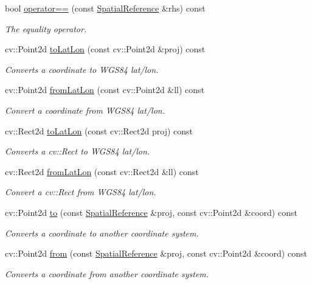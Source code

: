 \begin{DoxyCompactItemize}
bool \hyperlink{group___imagery_module_ga2c033f8a8c0c70c1db52343f66cc3245}{operator==} (const \hyperlink{classdg_1_1deepcore_1_1imagery_1_1_spatial_reference}{Spatial\+Reference} \&rhs) const 
\begin{DoxyCompactList}\small\item\em The equality operator. \end{DoxyCompactList}\item 
cv\+::\+Point2d \hyperlink{group___imagery_module_gad8d72dd386f86fd70fcd71197e408dfd}{to\+Lat\+Lon} (const cv\+::\+Point2d \&proj) const 
\begin{DoxyCompactList}\small\item\em Converts a coordinate to W\+G\+S84 lat/lon. \end{DoxyCompactList}\item 
cv\+::\+Point2d \hyperlink{group___imagery_module_gab9474c2105f1354b4139d5a905699f36}{from\+Lat\+Lon} (const cv\+::\+Point2d \&ll) const 
\begin{DoxyCompactList}\small\item\em Convert a coordinate from W\+G\+S84 lat/lon. \end{DoxyCompactList}\item 
cv\+::\+Rect2d \hyperlink{group___imagery_module_ga9d0268dbc9fbd5210fb0487915340737}{to\+Lat\+Lon} (const cv\+::\+Rect2d proj) const 
\begin{DoxyCompactList}\small\item\em Converts a cv\+::\+Rect to W\+G\+S84 lat/lon. \end{DoxyCompactList}\item 
cv\+::\+Rect2d \hyperlink{group___imagery_module_gaae5267f1271d5753680b57c8f2f99690}{from\+Lat\+Lon} (const cv\+::\+Rect2d \&ll) const 
\begin{DoxyCompactList}\small\item\em Convert a cv\+::\+Rect from W\+G\+S84 lat/lon. \end{DoxyCompactList}\item 
cv\+::\+Point2d \hyperlink{group___imagery_module_ga93813925a96518f8253c1cad40192013}{to} (const \hyperlink{classdg_1_1deepcore_1_1imagery_1_1_spatial_reference}{Spatial\+Reference} \&proj, const cv\+::\+Point2d \&coord) const 
\begin{DoxyCompactList}\small\item\em Converts a coordinate to another coordinate system. \end{DoxyCompactList}\item 
cv\+::\+Point2d \hyperlink{group___imagery_module_ga40b0fcb6642f08c38ae1f48b1369a631}{from} (const \hyperlink{classdg_1_1deepcore_1_1imagery_1_1_spatial_reference}{Spatial\+Reference} \&proj, const cv\+::\+Point2d \&coord) const 
\begin{DoxyCompactList}\small\item\em Converts a coordinate from another coordinate system. \end{DoxyCompactList}\end{DoxyCompactItemize}
